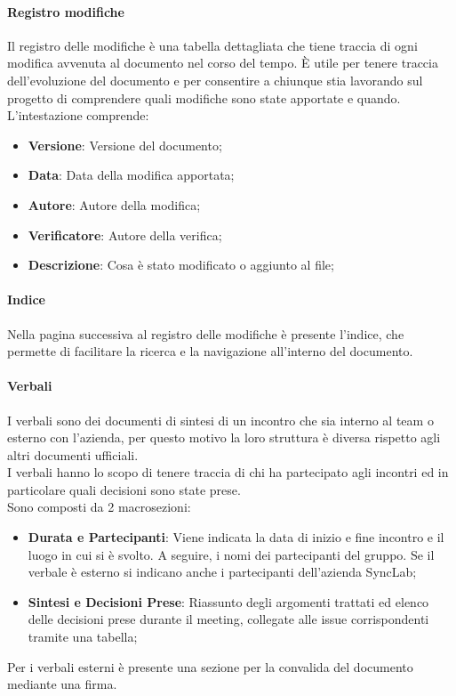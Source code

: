 \documentclass[10pt]{article}
\begin{document}
\begin{justify}
        \paragraph{Registro modifiche}
        Il registro delle modifiche è una tabella dettagliata che tiene traccia di ogni modifica avvenuta al documento nel corso del tempo. È utile per tenere traccia dell’evoluzione del documento e per consentire a chiunque stia lavorando sul progetto di comprendere quali modifiche sono state apportate e quando.
        L’intestazione comprende:
        \begin{itemize}
            \item \textbf{Versione}: Versione del documento;
            \item \textbf{Data}: Data della modifica apportata;
            \item \textbf{Autore}: Autore della modifica;
            \item \textbf{Verificatore}: Autore della verifica;
            \item \textbf{Descrizione}: Cosa è stato modificato o aggiunto al file;
        \end{itemize}

        \paragraph{Indice}
        Nella pagina successiva al registro delle modifiche è presente l’indice, che permette di facilitare la ricerca e la navigazione all’interno del documento.\\

        \paragraph{Verbali}
        I verbali sono dei documenti di sintesi di un incontro che sia interno al team o esterno con l'azienda, per questo motivo la loro struttura è diversa rispetto agli altri documenti ufficiali.\\
        I verbali hanno lo scopo di tenere traccia di chi ha partecipato agli incontri ed in particolare quali decisioni sono state prese.\\
        Sono composti da 2 macrosezioni:
        \begin{itemize}
            \item  \textbf{Durata e Partecipanti}: Viene indicata la data di inizio e fine incontro e il luogo in cui si è svolto. A seguire, i nomi dei partecipanti del gruppo. Se il verbale è esterno si indicano anche i partecipanti dell'azienda SyncLab;
            \item  \textbf{Sintesi e Decisioni Prese}: Riassunto degli argomenti trattati ed elenco delle decisioni prese durante il meeting, collegate alle issue corrispondenti tramite una tabella;
        \end{itemize}
        Per i verbali esterni è presente una sezione per la convalida del documento mediante una firma.\\


\end{justify}
\end{document}
